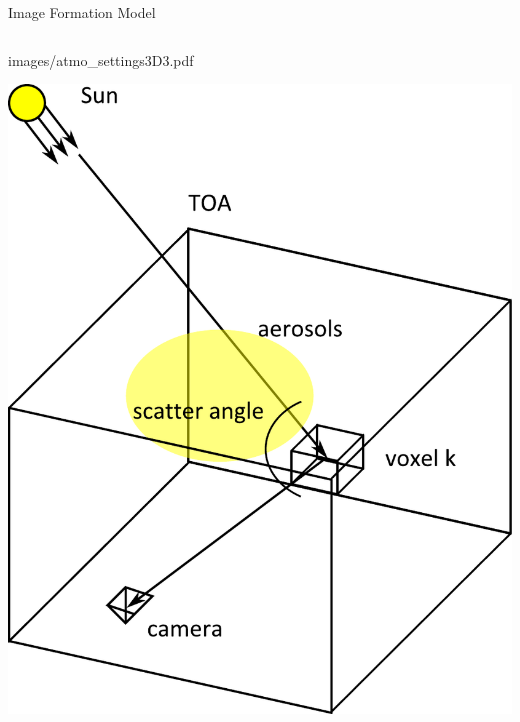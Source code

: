 \documentclass[compress,red,12pt]{beamer}
\begin{document}
\begin{frame}{Image Formation Model}
\begin{columns}[c]
\begin{overprint}
{{          {images/atmo_settings3D3.pdf}}}
       {\centerline{\includegraphics[width=\columnwidth]
          {images/atmo_settings3D5.pdf}}}
    \end{overprint}

  \end{columns}
\end{frame}
\end{document}
